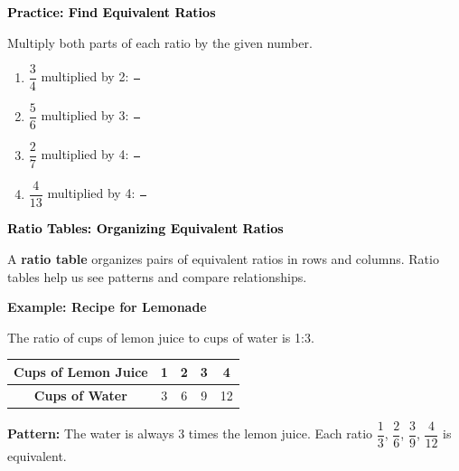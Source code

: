 \documentclass[12pt, letterpaper, fleqn]{article}
\begin{document}
\vspace{4mm}
\newpage
\begin{tcolorbox}[colback=customteal!20]
\large\textcolor{black}{\textbf{Practice: Find Equivalent Ratios}}
\end{tcolorbox}

\noindent
Multiply both parts of each ratio by the given number.

\vspace{1cm}

\begin{enumerate}[itemsep=3.5cm, leftmargin=0.6cm]
\item $\dfrac{3}{4}$ multiplied by 2: $\dfrac{\phantom{0}}{\phantom{0}}$
\item $\dfrac{5}{6}$ multiplied by 3: $\dfrac{\phantom{0}}{\phantom{0}}$
\item $\dfrac{2}{7}$ multiplied by 4: $\dfrac{\phantom{0}}{\phantom{0}}$
\item $\dfrac{4}{13}$ multiplied by 4: $\dfrac{\phantom{0}}{\phantom{0}}$
\end{enumerate}

\newpage

\begin{tcolorbox}[colback=customteal!20]
\large\textcolor{black}{\textbf{Ratio Tables: Organizing Equivalent Ratios}}
\end{tcolorbox}

\noindent
A \textbf{ratio table} organizes pairs of equivalent ratios in rows and columns. Ratio tables help us see patterns and compare relationships.

\vspace{3mm}

\begin{tcolorbox}[colback=white, colframe=black!25, boxrule=0.6pt, arc=4mm, left=6mm, right=6mm, top=5mm, bottom=5mm]

\textbf{Example: Recipe for Lemonade}

\noindent
The ratio of cups of lemon juice to cups of water is 1:3.

\vspace{1cm}
\begin{center}
\begin{tabular}{|c|c|c|c|c|}
\hline
\textbf{Cups of Lemon Juice} & 1 & 2 & 3 & 4 \\
\hline
\textbf{Cups of Water} & 3 & 6 & 9 & 12 \\
\hline
\end{tabular}
\end{center}
\vspace{1cm}

\noindent
\textbf{Pattern:} The water is always 3 times the lemon juice. Each ratio $\dfrac{1}{3}$, $\dfrac{2}{6}$, $\dfrac{3}{9}$, $\dfrac{4}{12}$ is equivalent.

\end{tcolorbox}
\end{document}

